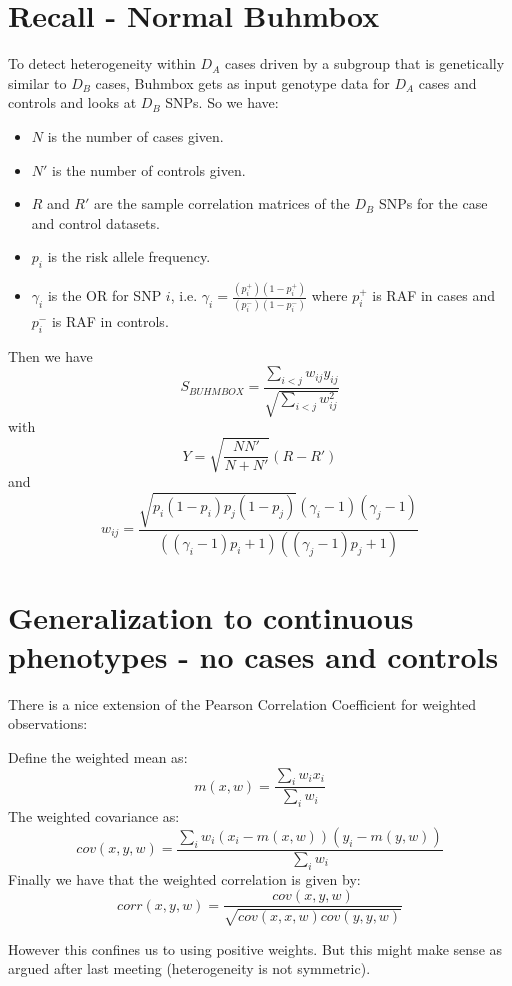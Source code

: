 \documentclass[11pt]{hw-template}
\begin{document}
\maketitle

\section*{Recall - Normal Buhmbox}
To detect heterogeneity within $D_A$ cases driven by a subgroup that is genetically similar to $D_B$ cases, Buhmbox gets
as input genotype data for $D_A$ cases and controls and looks at $D_B$ SNPs. So we have:
\begin{itemize}
  \item $N$ is the number of cases given.
  \item $N'$ is the number of controls given.
  \item $R$ and $R'$ are the sample correlation matrices of the $D_B$ SNPs for the case and control datasets.
  \item $p_i$ is the risk allele frequency.
  \item $\gamma_i$ is the OR for SNP $i$, i.e. $\gamma_i = \frac{(p_i^+)(1-p_i^+)}{(p_i^-)(1-p_i^-)}$ where $p_i^+$ is RAF in cases and $p_i^-$ is RAF in controls.
\end{itemize}

Then we have 
$$S_{BUHMBOX} = \frac{\sum_{i < j} w_{ij}y_{ij}}{\sqrt{\sum_{i<j}w_{ij}^2}}$$
with
$$Y = \sqrt{\frac{NN'}{N+N'}}(R-R')$$
and
$$w_{ij} = \frac{\sqrt{p_i(1-p_i)p_j(1-p_j)}(\gamma_i - 1)(\gamma_j - 1)}{((\gamma_i-1)p_i + 1)((\gamma_j - 1)p_j + 1)}$$
\section*{Generalization to continuous phenotypes - no cases and controls}
There is a nice extension of the Pearson Correlation Coefficient for weighted observations:

\noindent Define the weighted mean as:
$$m(x, w) = \frac{\sum_i w_ix_i}{\sum_i w_i}$$
The weighted covariance as:
$$cov(x, y, w) = \frac{\sum_i w_i(x_i - m(x, w))(y_i - m(y, w))}{\sum_i w_i}$$
Finally we have that the weighted correlation is given by:
$$corr(x, y, w) = \frac{cov(x, y, w)}{\sqrt{cov(x, x, w)cov(y, y, w)}}$$

However this confines us to using positive weights. But this might make sense as argued
after last meeting (heterogeneity is not symmetric).
\end{document}
